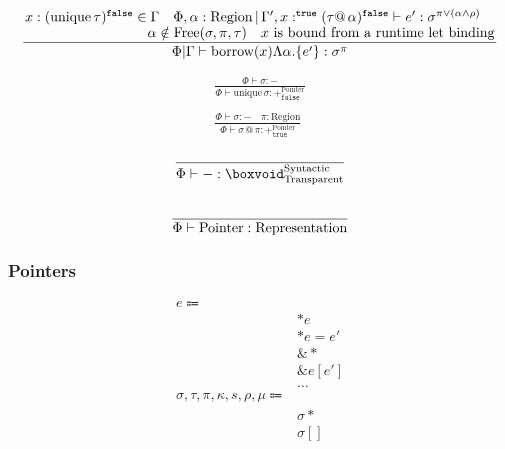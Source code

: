 \documentclass {article}
\begin{document}
\begin{gather*}
\frac
{\splitfrac{x : (\text{unique} \, \tau)^\texttt{false} \in \Gamma \quad \Phi,\alpha : \text{Region}  \, | \, \Gamma', x :^\texttt{true} (\tau @ \, \alpha)^\texttt{false} \vdash e' : \sigma^{\pi \lor (\alpha \land \rho)}}{\alpha \notin \text{Free}(\sigma, \pi, \tau) \quad \text{$x$ is bound from a runtime let binding}}}
{\Phi | \Gamma \vdash \text{borrow} (x)  \Lambda \alpha. \{ e' \} : \sigma^{\pi} }
\end{gather*}

\begin{gather*}
\frac
{\Phi \vdash \sigma : -}
{\Phi \vdash \text{unique} \, \sigma : +^\text{Pointer}_\texttt{false}} \\
\\
\frac
{\Phi \vdash \sigma : - \quad \pi : \text{Region}}
{\Phi \vdash \sigma \, @ \, \pi : +^\text{Pointer}_\texttt{true}} 
\end{gather*}

\begin{gather*}
\frac
{}
{\Phi \vdash - : \boxvoid^{\text{Syntactic}}_{\text{Transparent}}} \\
\\
\frac
{}
{\Phi \vdash \text{Pointer} : \text{Representation}} \\
\end{gather*}

\subsubsection{Pointers}
\begin{align*}
e \Coloneqq & \\
& *e \tag{Read Pointer} \\
& *e = e' \tag{Write Pointer} \\
& \& * \tag{Array to Pointer} \\
& \& e [e'] \tag{Array Increment} \\
& \dots \\
\sigma, \tau, \pi, \kappa, s, \rho, \mu \Coloneqq & \\
& \sigma* \tag{Pointer} \\
& \sigma[] \tag{Array Pointer} \\
\end{align*}
\end{document}
